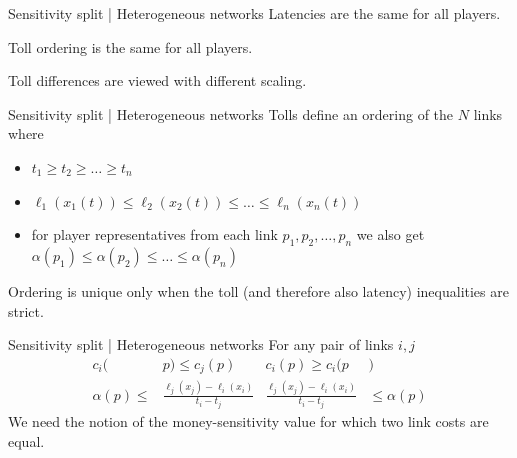 \documentclass{beamer}
\begin{document}
\begin{frame}{Sensitivity split | Heterogeneous networks}
	Latencies are the same for all players.

	Toll ordering is the same for all players.

	Toll differences are viewed with different scaling.
	\\[15pt]
\end{frame}

\begin{frame}{Sensitivity split | Heterogeneous networks}
	Tolls define an ordering of the $N$ links where
	\begin{itemize}
		\item $t_1 \ge t_2 \ge \dots \ge t_n$
		\item $\ell_1(x_1(t)) \le \ell_2(x_2(t)) \le \dots \le \ell_n(x_n(t))$
		\item for player representatives from each link $p_1, p_2, \dots, p_n$ we also get $\alpha(p_1) \le \alpha(p_2) \le \dots \le \alpha(p_n)$
	\end{itemize}
	Ordering is unique only when the toll (and therefore also latency) inequalities are strict.
\end{frame}

\begin{frame}{Sensitivity split | Heterogeneous networks}
	For any pair of links $i, j$
	\begin{align*}
		c_i(&p) \le c_j(p) & c_i(p) \ge c_i(p&) \\[10pt]
		\alpha(p) \le &\frac{\ell_j(x_j) - \ell_i(x_i)}{t_i - t_j} & \frac{\ell_j(x_j) - \ell_i(x_i)}{t_i - t_j}& \le \alpha(p)
	\end{align*}
	We need the notion of the money-sensitivity value for which two link costs are equal.
\end{frame}
\end{document}
